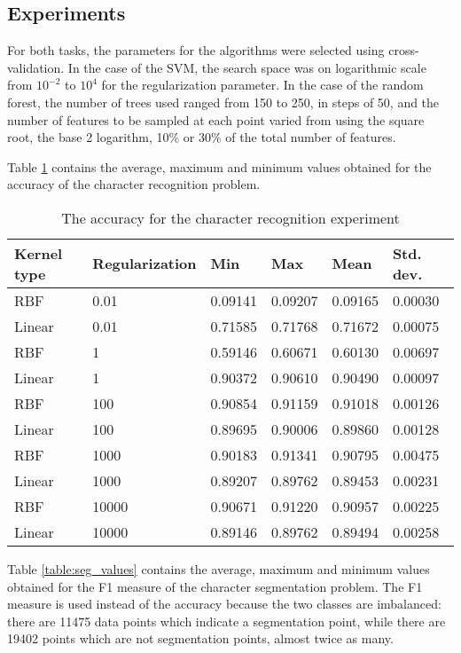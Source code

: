 \subsection{Experiments}

For both tasks, the parameters for the algorithms were selected using cross-validation. In the case of the SVM, the search space was on logarithmic scale from $10^{-2}$ to $10^4$ for the regularization parameter. In the case of the random forest, the number of trees used ranged from 150 to 250, in steps of 50, and the number of features to be sampled at each point varied from using the square root, the base 2 logarithm, 10\% or 30\% of the total number of features. 

Table \ref{table:recog_values} contains the average, maximum and minimum values obtained for the accuracy of the character recognition problem.

\begin{table}[h]
\caption{The accuracy for the character recognition experiment}
\label{table:recog_values}
\begin{tabular}{llllll}
\hline
Kernel type & Regularization & Min     & Max     & Mean    & Std. dev. \\ \hline
RBF & 0.01 & 0.09141 & 0.09207 & 0.09165 & 0.00030 \\ 
Linear & 0.01 & 0.71585 & 0.71768 & 0.71672 & 0.00075 \\ 
RBF & 1 & 0.59146 & 0.60671 & 0.60130 & 0.00697 \\ 
Linear & 1 & 0.90372 & 0.90610 & 0.90490 & 0.00097 \\ 
RBF & 100 & 0.90854 & 0.91159 & 0.91018 & 0.00126 \\ 
Linear & 100 & 0.89695 & 0.90006 & 0.89860 & 0.00128 \\ 
RBF & 1000 & 0.90183 & 0.91341 & 0.90795 & 0.00475 \\ 
Linear & 1000 & 0.89207 & 0.89762 & 0.89453 & 0.00231 \\ 
RBF & 10000 & 0.90671 & 0.91220 & 0.90957 & 0.00225 \\ 
Linear & 10000 & 0.89146 & 0.89762 & 0.89494 & 0.00258 \\ \hline
\end{tabular}
\end{table}

Table \ref{table:seg_values} contains the average, maximum and minimum values obtained for the F1 measure of the character segmentation problem. The F1 measure is used instead of the accuracy because the two classes are imbalanced: there are 11475 data points which indicate a segmentation point, while there are 19402 points which are not segmentation points, almost twice as many. 

